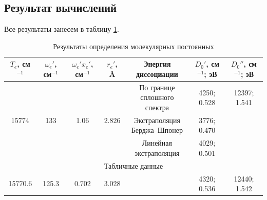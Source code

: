 \subsection{Результат вычислений}
Все результаты занесем в таблицу \ref{table:final_results}.
\begin{table}[h!]
	\centering
	\caption{Результаты определения молекулярных постоянных}
	\begin{tabular}{|c|c|c|c|c|c|c|}
		\hline
		$T_e$, см$^{-1}$ & $\omega_e'$, см$^{-1}$ & $\omega_e'x_e'$, см$^{-1}$ & $r_e'$, \AA & Энергия диссоциации & $D_0'$, см$^{-1}$; эВ & $D_0''$, см$^{-1}$; эВ \bigstrut\\
		\hline
		\multirow{3}[6]{*}{15774} & \multirow{3}[6]{*}{133} & \multirow{3}[6]{*}{1.06} & \multirow{3}[6]{*}{2.826} & \makecell{По границе \\сплошного спектра} & 4250; 0.528 & 12397; 1.541 \bigstrut\\
		\cline{5-7}       &   &   &   & \makecell{Экстраполяция \\Берджа--Шпонер} & 3776; 0.470 &  \bigstrut\\
		\cline{5-7}       &   &   &   & \makecell{Линейная \\экстраполяция} & 4029; 0.501 &  \bigstrut\\
		\hline
		\multicolumn{7}{|c|}{Табличные данные} \bigstrut\\
		\hline
		15770.6& 125.3  & 0.702  &  3.028 &   & 4320; 0.536  & 12440; 1.542 \bigstrut\\
		\hline
		
	\end{tabular}%
	\label{table:final_results}%
\end{table}%

